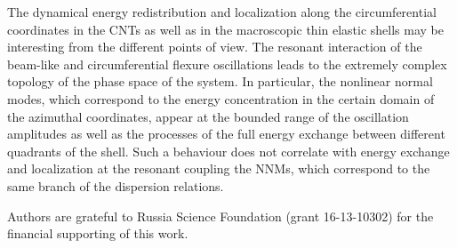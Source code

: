 The dynamical energy redistribution and localization along the circumferential coordinates in the CNTs as well as in the macroscopic thin elastic shells may be interesting from the different points of view.
The resonant interaction of the beam-like and circumferential flexure oscillations leads to the extremely complex topology of the phase space of the system.
In particular, the nonlinear normal modes, which correspond to the energy concentration in the certain domain of the azimuthal coordinates, appear at the bounded range of the oscillation amplitudes as well as the processes of the full energy exchange between different quadrants of the shell.
Such a behaviour does not correlate with energy exchange and localization at the resonant coupling the NNMs, which correspond to the same branch of the dispersion relations.

\begin{acknowledgements}
Authors are grateful to Russia Science Foundation (grant 16-13-10302) for the financial supporting of this work.
\end{acknowledgements}


